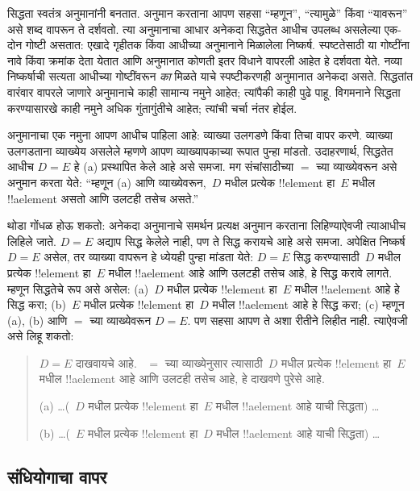 \documentclass[../../../include/open-logic-section]{subfiles}
\begin{document}


सिद्धता स्वतंत्र अनुमानांनी बनतात. अनुमान करताना आपण सहसा “म्हणून”, “त्यामुळे” किंवा “यावरून” असे शब्द वापरून ते दर्शवतो. त्या अनुमानाचा आधार अनेकदा सिद्धतेत आधीच उपलब्ध असलेल्या एक-दोन गोष्टी असतात: एखादे गृहीतक किंवा आधीच्या अनुमानाने मिळालेला निष्कर्ष. स्पष्टतेसाठी या गोष्टींना नावे किंवा क्रमांक देता येतात आणि अनुमानात कोणती इतर विधाने वापरली आहेत हे दर्शवता येते. नव्या निष्कर्षाची सत्यता आधीच्या गोष्टींवरून \emph{का} मिळते याचे स्पष्टीकरणही अनुमानात अनेकदा असते. सिद्धतांत वारंवार वापरले जाणारे अनुमानाचे काही सामान्य नमुने आहेत; त्यांपैकी काही पुढे पाहू. विगमनाने सिद्धता करण्यासारखे काही नमुने अधिक गुंतागुंतीचे आहेत; त्यांची चर्चा नंतर होईल.

अनुमानाचा एक नमुना आपण आधीच पाहिला आहे: व्याख्या उलगडणे किंवा तिचा वापर करणे. व्याख्या उलगडताना व्याख्येय असलेले म्हणणे आपण व्याख्यापकाच्या रूपात पुन्हा मांडतो. उदाहरणार्थ, सिद्धतेत आधीच $D = E$ हे (a) प्रस्थापित केले आहे असे समजा. मग संचांसाठीच्या $=$ च्या व्याख्येवरून असे अनुमान करता येते: “म्हणून (a) आणि व्याख्येवरून,~$D$ मधील प्रत्येक !!{element} हा~$E$ मधील !!a{element} असतो आणि उलटही तसेच असते.”

थोडा गोंधळ होऊ शकतो: अनेकदा अनुमानाचे समर्थन प्रत्यक्ष अनुमान करताना लिहिण्याऐवजी त्याआधीच लिहिले जाते. $D = E$ अद्याप सिद्ध केलेले नाही, पण ते सिद्ध करायचे आहे असे समजा. अपेक्षित निष्कर्ष $D = E$ असेल, तर व्याख्या वापरून हे ध्येयही पुन्हा मांडता येते: $D = E$ सिद्ध करण्यासाठी~$D$ मधील प्रत्येक !!{element} हा~$E$ मधील !!a{element} आहे आणि उलटही तसेच आहे, हे सिद्ध करावे लागते. म्हणून सिद्धतेचे रूप असे असेल: (a)~$D$ मधील प्रत्येक !!{element} हा~$E$ मधील !!a{element} आहे हे सिद्ध करा; (b)~$E$ मधील प्रत्येक !!{element} हा~$D$ मधील !!a{element} आहे हे सिद्ध करा; (c) म्हणून (a), (b) आणि $=$ च्या व्याख्येवरून $D = E$. पण सहसा आपण ते अशा रीतीने लिहीत नाही. त्याऐवजी असे लिहू शकतो:
\begin{quote}
$D = E$ दाखवायचे आहे. ~$=$ च्या व्याख्येनुसार त्यासाठी~$D$ मधील प्रत्येक !!{element} हा~$E$ मधील !!a{element} आहे आणि उलटही तसेच आहे, हे दाखवणे पुरेसे आहे.

(a) \dots (~$D$ मधील प्रत्येक !!{element} हा~$E$ मधील !!a{element} आहे याची सिद्धता) \dots

(b) \dots (~$E$ मधील प्रत्येक !!{element} हा~$D$ मधील !!a{element} आहे याची सिद्धता) \dots
\end{quote}

\subsection{संधियोगाचा वापर}
\end{document}
